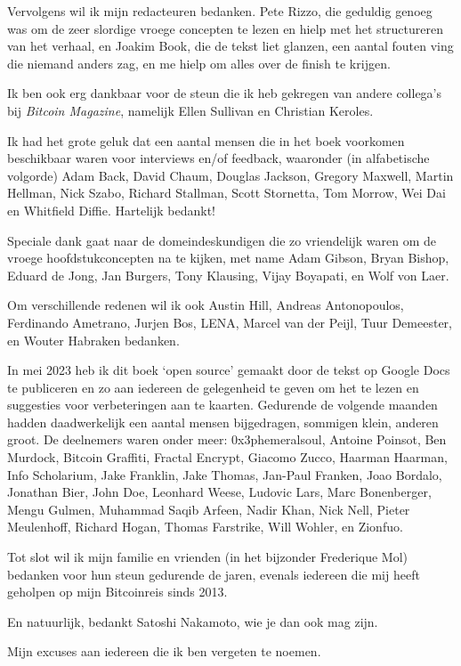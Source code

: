 \documentclass[
  a5paper,
  smalldemyvopaper,11pt,twoside,onecolumn,openright,extrafontsizes]{memoir}
\begin{document}
Vervolgens wil ik mijn redacteuren bedanken. Pete Rizzo, die geduldig
genoeg was om de zeer slordige vroege concepten te lezen en hielp met
het structureren van het verhaal, en Joakim Book, die de tekst liet
glanzen, een aantal fouten ving die niemand anders zag, en me hielp om
alles over de finish te krijgen.

Ik ben ook erg dankbaar voor de steun die ik heb gekregen van andere
collega's bij \emph{Bitcoin Magazine}, namelijk Ellen Sullivan en
Christian Keroles.

Ik had het grote geluk dat een aantal mensen die in het boek voorkomen
beschikbaar waren voor interviews en/of feedback, waaronder (in
alfabetische volgorde) Adam Back, David Chaum, Douglas Jackson, Gregory
Maxwell, Martin Hellman, Nick Szabo, Richard Stallman, Scott Stornetta,
Tom Morrow, Wei Dai en Whitfield Diffie. Hartelijk bedankt!

Speciale dank gaat naar de domeindeskundigen die zo vriendelijk waren om
de vroege hoofdstukconcepten na te kijken, met name Adam Gibson, Bryan
Bishop, Eduard de Jong, Jan Burgers, Tony Klausing, Vijay Boyapati, en
Wolf von Laer.

Om verschillende redenen wil ik ook Austin Hill, Andreas Antonopoulos,
Ferdinando Ametrano, Jurjen Bos, LENA, Marcel van der Peijl, Tuur
Demeester, en Wouter Habraken bedanken.

In mei 2023 heb ik dit boek `open source' gemaakt door de tekst op
Google Docs te publiceren en zo aan iedereen de gelegenheid te geven om
het te lezen en suggesties voor verbeteringen aan te kaarten. Gedurende
de volgende maanden hadden daadwerkelijk een aantal mensen bijgedragen,
sommigen klein, anderen groot. De deelnemers waren onder meer:
0x3phemeralsoul, Antoine Poinsot, Ben Murdock, Bitcoin Graffiti, Fractal
Encrypt, Giacomo Zucco, Haarman Haarman, Info Scholarium, Jake Franklin,
Jake Thomas, Jan-Paul Franken, Joao Bordalo, Jonathan Bier, John Doe,
Leonhard Weese, Ludovic Lars, Marc Bonenberger, Mengu Gulmen, Muhammad
Saqib Arfeen, Nadir Khan, Nick Nell, Pieter Meulenhoff, Richard Hogan,
Thomas Farstrike, Will Wohler, en Zionfuo.

Tot slot wil ik mijn familie en vrienden (in het bijzonder Frederique
Mol) bedanken voor hun steun gedurende de jaren, evenals iedereen die
mij heeft geholpen op mijn Bitcoinreis sinds 2013.

En natuurlijk, bedankt Satoshi Nakamoto, wie je dan ook mag zijn.

Mijn excuses aan iedereen die ik ben vergeten te noemen.
\end{document}
